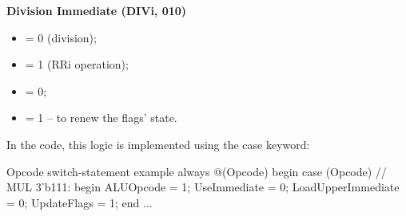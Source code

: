 \textbf{Division Immediate (DIVi, 010)}
\begin{itemize}
    \setlength\itemsep{2pt}
    \item {} = 0 (division);
    \item {} = 1 (RRi operation);
    \item {} = 0;
    \item {} = 1 -- to renew the flags' state.
\end{itemize}

In the code, this logic is implemented using the case keyword:
\begin{code}[12]{Opcode switch-statement example}
    always @(Opcode) begin
	case (Opcode)
        // MUL
        3'b111: begin
            ALUOpcode = 1;
            UseImmediate = 0;
            LoadUpperImmediate = 0;
            UpdateFlags = 1;
        end
    ...
\end{code}
